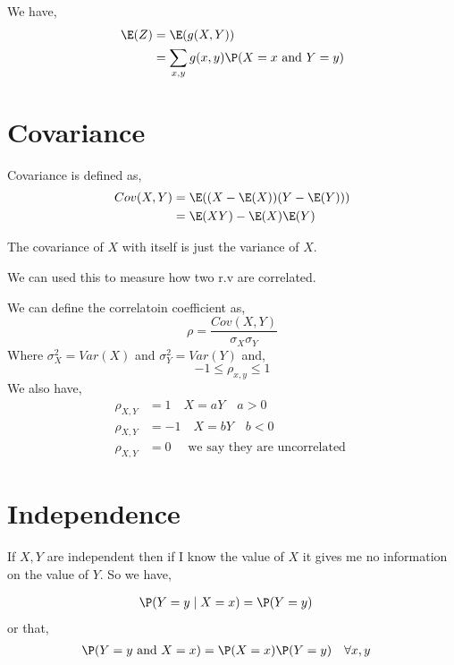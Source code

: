 We have,
\begin{align*}
	\E(Z) &= \E(g(X, Y))\\
	      &= \sum_{x,y} g(x,y) \P(X = x \text{ and } Y = y)
\end{align*}

\section{Covariance}

\begin{definition}
	Covariance is defined as,
	\begin{align*}
		Cov(X, Y) &= \E((X - \E(X)) (Y - \E(Y)))\\
			  &= \E(XY) - \E(X)\E(Y)
	\end{align*}
\end{definition}
\begin{note}
The covariance of $X$ with itself is just the variance of $X$.
\end{note}
\begin{note}
	We can used this to measure how two r.v are correlated.
\end{note}

We can define the correlatoin coefficient as,
$$
	\rho = \frac{Cov(X, Y)}{\sigma_X \sigma_Y}
$$
Where $\sigma_X^2 = Var(X)$ and $\sigma_Y^2 = Var(Y)$ and, $$
-1 \le \rho_{x, y} \le 1 $$
We also have,
\begin{align*}
	\rho_{X, Y} &= 1 \quad X = aY \quad a > 0\\
	\rho_{X, Y} &= -1 \quad X = bY \quad b < 0\\
	\rho_{X, Y} &= 0  \quad \text{ we say they are uncorrelated }
\end{align*}

\section{Independence}
\begin{definition}
	
If $X, Y$ are independent then if I know the value of $X$ it gives me no information on the value of $Y$. So we have,

\begin{align*}
	\P(Y = y \mid X = x) &= \P(Y= y)
\end{align*}
or that, 
\begin{align*}
	\P(Y = y \text{ and  } X = x) &= \P(X = x) \P(Y = y) \quad \forall x,y
\end{align*}


\end{definition}

